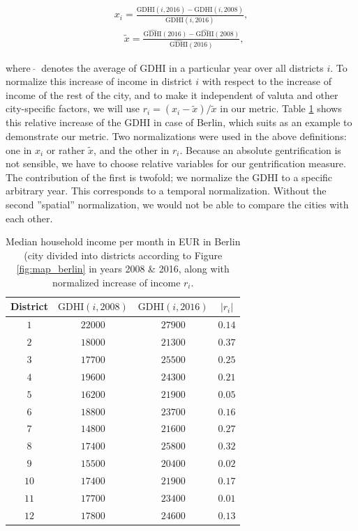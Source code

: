 \documentclass[a4paper, 10pt]{IEEEconf}      %
\providecommand{\tabularnewline}{\\}
\begin{document}
\begin{equation}
\begin{split}
x_{i}=\frac{\mathrm{GDHI}(i,2016)-\mathrm{GDHI}(i,2008)}{\mathrm{GDHI}(i,2016)}, \\
\quad\tilde{x}=\frac{\widehat{\mathrm{GDHI}}(2016)-\widehat{\mathrm{GDHI}}(2008)}{\widehat{\mathrm{GDHI}}(2016)},
\end{split}
\label{eq:gdhi}
\end{equation}

where $\ \widehat{}\ $ denotes the average of GDHI in a particular year over all districts $i$. To normalize this increase of income
in district $i$ with respect to the increase of income of the rest of the city, and to make it independent of valuta and other city-specific
factors, we will use $r_{i}=\left(x_{i}-\tilde{x}\right)/\tilde{x}$ in our metric. Table \ref{tab:Median-household-income} shows this relative
increase of the GDHI in case of Berlin, which suits as an example to demonstrate our metric. Two normalizations were used in the above definitions: 
one in $x_{i}$ or rather $\tilde{x}$, and the other in $r_{i}$.
Because an absolute gentrification is not sensible, we have to choose relative variables for our gentrification measure. 
The contribution of the first is twofold; we normalize the GDHI to a specific arbitrary year. This corresponds to a temporal 
normalization. Without the second ''spatial'' normalization, we would not be able to compare the cities with each other. 

\begin{table}[h]
	\begin{centering}
		\begin{tabular}{|c|c|c|c|}
			\hline 
			District & $\mathrm{GDHI}(i,2008)$ & $\mathrm{GDHI}(i,2016)$ & $\left|r_{i}\right|$ \tabularnewline
			\hline 
			\hline 
			$1$ & $22000$ & $27900$ & $0.14$\tabularnewline
			\hline 
			$2$ & $18000$ & $21300$ & $0.37$\tabularnewline
			\hline 
			$3$ & $17700$ & $25500$ & $0.25$\tabularnewline
			\hline 
			$4$ & $19600$ & $24300$ & $0.21$\tabularnewline
			\hline  
			$5$ & $16200$ & $21900$ & $0.05$\tabularnewline
			\hline 
			$6$ & $18800$ & $23700$ & $0.16$\tabularnewline
			\hline 
			$7$ & $14800$ & $21600$ & $0.27$\tabularnewline
			\hline 
			$8$ & $17400$ & $25800$ & $0.32$\tabularnewline
			\hline 
			$9$ & $15500$ & $20400$ & $0.02$\tabularnewline
			\hline 
			$10$ & $17400$ & $21900$ & $0.17$\tabularnewline
			\hline 
			$11$ & $17700$ & $23400$ & $0.01$\tabularnewline
			\hline 
			$12$ & $17800$ & $24600$ & $0.13$\tabularnewline
			\hline 
		\end{tabular}
		\par\end{centering}
	
	\caption{Median household income per month in EUR in Berlin (city divided into
		districts according to Figure \ref{fig:map_berlin} in years
		2008 \& 2016, along with normalized increase of income $r_i$.}
		\label{tab:Median-household-income}
\end{table}
\end{document}
